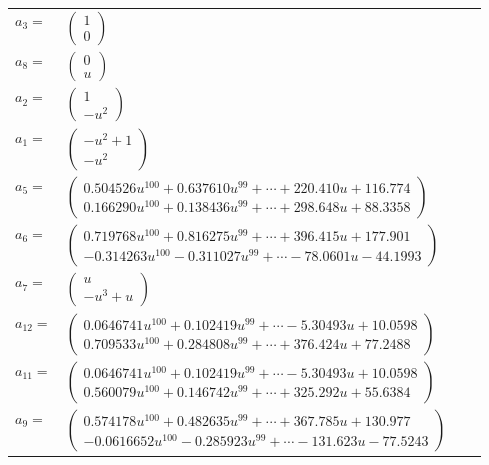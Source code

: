 \documentclass[1p]{elsarticle_modified}
\theoremstyle{definition}
\begin{document}
\begin{tabular}{m{7pt} m{180pt} m{7pt} m{180pt} }
\flushright $a_{3}=$&$\begin{pmatrix}1\\0\end{pmatrix}$ \\
\flushright $a_{8}=$&$\begin{pmatrix}0\\u\end{pmatrix}$ \\
\flushright $a_{2}=$&$\begin{pmatrix}1\\- u^2\end{pmatrix}$ \\
\flushright $a_{1}=$&$\begin{pmatrix}- u^2+1\\- u^2\end{pmatrix}$ \\
\flushright $a_{5}=$&$\begin{pmatrix}0.504526 u^{100}+0.637610 u^{99}+\cdots+220.410 u+116.774\\0.166290 u^{100}+0.138436 u^{99}+\cdots+298.648 u+88.3358\end{pmatrix}$ \\
\flushright $a_{6}=$&$\begin{pmatrix}0.719768 u^{100}+0.816275 u^{99}+\cdots+396.415 u+177.901\\-0.314263 u^{100}-0.311027 u^{99}+\cdots-78.0601 u-44.1993\end{pmatrix}$ \\
\flushright $a_{7}=$&$\begin{pmatrix}u\\- u^3+u\end{pmatrix}$ \\
\flushright $a_{12}=$&$\begin{pmatrix}0.0646741 u^{100}+0.102419 u^{99}+\cdots-5.30493 u+10.0598\\0.709533 u^{100}+0.284808 u^{99}+\cdots+376.424 u+77.2488\end{pmatrix}$ \\
\flushright $a_{11}=$&$\begin{pmatrix}0.0646741 u^{100}+0.102419 u^{99}+\cdots-5.30493 u+10.0598\\0.560079 u^{100}+0.146742 u^{99}+\cdots+325.292 u+55.6384\end{pmatrix}$ \\
\flushright $a_{9}=$&$\begin{pmatrix}0.574178 u^{100}+0.482635 u^{99}+\cdots+367.785 u+130.977\\-0.0616652 u^{100}-0.285923 u^{99}+\cdots-131.623 u-77.5243\end{pmatrix}$ \\

\end{tabular}
\end{document}
